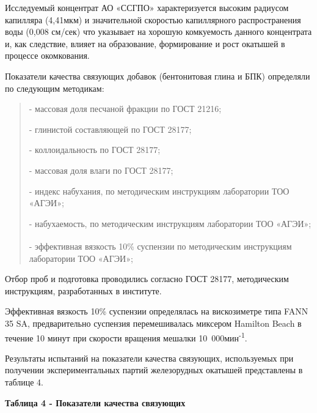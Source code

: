 Исследуемый концентрат АО «ССГПО» характеризуется высоким радиусом
капилляра (4,41мкм) и значительной скоростью капиллярного
распространения воды (0,008 см/сек) что указывает на хорошую комкуемость
данного концентрата и, как следствие, влияет на образование,
формирование и рост окатышей в процессе окомкования.

Показатели качества связующих добавок (бентонитовая глина и БПК)
определяли по следующим методикам:

\begin{quote}
- массовая доля песчаной фракции по ГОСТ 21216;

- глинистой составляющей по ГОСТ 28177;

- коллоидальность по ГОСТ 28177;

- массовая доля влаги по ГОСТ 28177;

- индекс набухания, по методическим инструкциям лаборатории ТОО «АГЭИ»;

- набухаемость, по методическим инструкциям лаборатории ТОО «АГЭИ»;

- эффективная вязкость 10\%\textsuperscript{} суспензии по
методическим инструкциям лаборатории ТОО «АГЭИ»;
\end{quote}

Отбор проб и подготовка проводились согласно ГОСТ 28177, методическим
инструкциям, разработанных в институте.

Эффективная вязкость 10\% суспензии определялась на вискозиметре типа
FANN 35 SA, предварительно суспензия перемешивалась миксером Hamilton
Beach в течение 10 минут при скорости вращения мешалки
10~000мин\textsuperscript{-1}.

Результаты испытаний на показатели качества связующих, используемых при
получении экспериментальных партий железорудных окатышей представлены в
таблице 4.

{\bfseries Таблица 4 - Показатели качества связующих}

